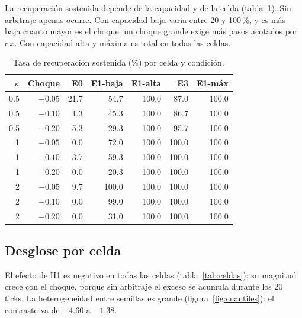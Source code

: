 La recuperación sostenida depende de la capacidad y de la celda (tabla~\ref{tab:recuperacion}). Sin arbitraje apenas ocurre. Con capacidad baja varía entre 20 y 100\,\%, y es más baja cuanto mayor es el choque: un choque grande exige más pasos acotados por $c\,x$. Con capacidad alta y máxima es total en todas las celdas.

\begin{table}[htbp]
\centering
\caption{Tasa de recuperación sostenida (\%) por celda y condición.}
\label{tab:recuperacion}
\small
\begin{tabular}{@{}rrrrrrr@{}}
\toprule
$\kappa$ & Choque & E0 & E1-baja & E1-alta & E3 & E1-máx \\
\midrule
0.5 & $-0.05$ & 21.7 & 54.7 & 100.0 & 87.0 & 100.0 \\
0.5 & $-0.10$ & 1.3 & 45.3 & 100.0 & 86.7 & 100.0 \\
0.5 & $-0.20$ & 5.3 & 29.3 & 100.0 & 95.7 & 100.0 \\
1 & $-0.05$ & 0.0 & 72.0 & 100.0 & 100.0 & 100.0 \\
1 & $-0.10$ & 3.7 & 59.3 & 100.0 & 100.0 & 100.0 \\
1 & $-0.20$ & 0.0 & 20.3 & 100.0 & 100.0 & 100.0 \\
2 & $-0.05$ & 9.7 & 100.0 & 100.0 & 100.0 & 100.0 \\
2 & $-0.10$ & 0.0 & 99.0 & 100.0 & 100.0 & 100.0 \\
2 & $-0.20$ & 0.0 & 31.0 & 100.0 & 100.0 & 100.0 \\
\bottomrule
\end{tabular}
\end{table}

\subsection{Desglose por celda}

El efecto de H1 es negativo en todas las celdas (tabla~\ref{tab:celdas}); su magnitud crece con el choque, porque sin arbitraje el exceso se acumula durante los 20 ticks. La heterogeneidad entre semillas es grande (figura~\ref{fig:cuantiles}): el contraste va de $-4.60$ a $-1.38$.

